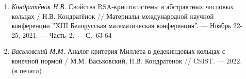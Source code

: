 \begin{enumerate}
    \item \label{source:XIII_Belarussian_math_conference_2021}
    \textit{Кондратёнок Н.В.} Свойства RSA-криптосистемы в абстрактных числовых кольцах / Н.В. Кондратёнок // Материалы международной научной конференции ''XIII Белорусская математическая конференция''. --- Ноябрь 22-25, 2021. --- Часть~2. --- С.~63-64

    \item \label{source:CSIST_2022}
    \textit{Васьковский М.М.} Аналог критерия Миллера в дедекиндовых кольцах с конечной нормой / М.М. Васьковский, Н.В. Кондратёнок // CSIST. --- 2022. (в печати)

\end{enumerate}

